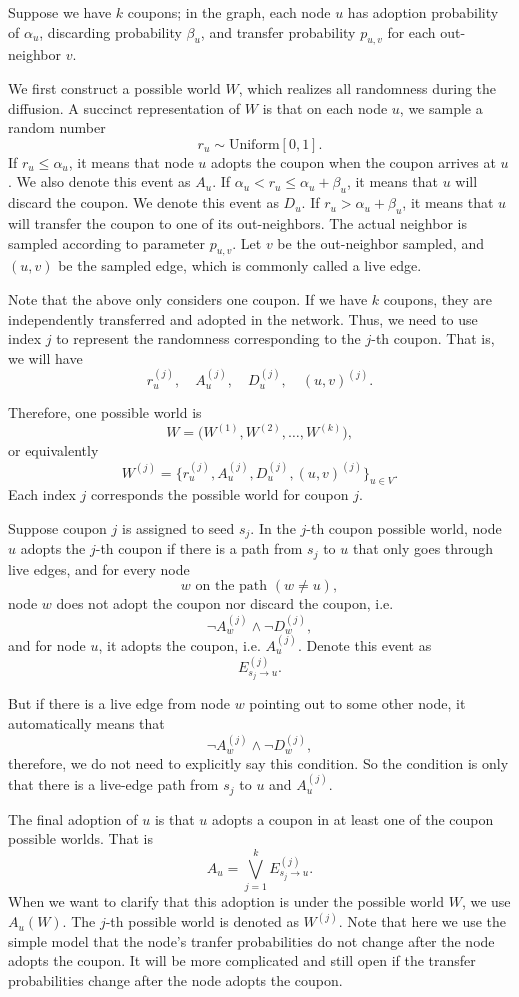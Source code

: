 \documentclass[11pt]{article}
\begin{document}
Suppose we have $k$ coupons; in the graph, each node $u$ has adoption probability of $\alpha_u$, discarding probability $\beta_u$, and transfer probability $p_{u,v}$ for each out-neighbor $v$.

We first construct a possible world $W$, which realizes all randomness during the diffusion. A succinct representation of $W$ is that on each node $u$, we sample a random number
\[
r_u \sim \mathrm{Uniform}[0,1].
\]
If $r_u \le \alpha_u$, it means that node $u$ adopts the coupon when the coupon arrives at $u$. We also denote this event as $A_u$.  
If $\alpha_u < r_u \le \alpha_u + \beta_u$, it means that $u$ will discard the coupon. We denote this event as $D_u$.  
If $r_u > \alpha_u + \beta_u$, it means that $u$ will transfer the coupon to one of its out-neighbors. The actual neighbor is sampled according to parameter $p_{u,v}$. Let $v$ be the out-neighbor sampled, and $(u,v)$ be the sampled edge, which is commonly called a live edge.

Note that the above only considers one coupon. If we have $k$ coupons, they are independently transferred and adopted in the network. Thus, we need to use index $j$ to represent the randomness corresponding to the $j$-th coupon. That is, we will have
\[
r_u^{(j)}, \quad A_u^{(j)}, \quad D_u^{(j)}, \quad (u,v)^{(j)}.
\]

Therefore, one possible world is
\[
W = \bigl(W^{(1)}, W^{(2)}, \dots, W^{(k)}\bigr),
\]
or equivalently
\[
W^{(j)} = \{ r_u^{(j)}, A_u^{(j)}, D_u^{(j)}, (u,v)^{(j)} \}_{u \in V}.
\]
Each index $j$ corresponds the possible world for coupon $j$.

Suppose coupon $j$ is assigned to seed $s_j$. In the $j$-th coupon possible world, node $u$ adopts the $j$-th coupon if there is a path from $s_j$ to $u$ that only goes through live edges, and for every node
\[
w \text{ on the path } (w \neq u),
\]
node $w$ does not adopt the coupon nor discard the coupon, i.e.
\[
\neg A_w^{(j)} \wedge \neg D_w^{(j)},
\]
and for node $u$, it adopts the coupon, i.e. $A_u^{(j)}$. Denote this event as
\[
E_{s_j \rightarrow u}^{(j)}.
\]

But if there is a live edge from node $w$ pointing out to some other node, it automatically means that
\[
\neg A_w^{(j)} \wedge \neg D_w^{(j)},
\]
therefore, we do not need to explicitly say this condition. So the condition is only that there is a live-edge path from $s_j$ to $u$ and $A_u^{(j)}$.

The final adoption of $u$ is that $u$ adopts a coupon in at least one of the coupon possible worlds. That is
\[
A_u = \bigvee_{j=1}^k E_{s_j \rightarrow u}^{(j)}.
\]
When we want to clarify that this adoption is under the possible world $W$, we use $A_u(W)$. The $j$-th possible world is denoted as $W^{(j)}$. Note that here we use the simple model that the node's tranfer probabilities do not change after the node adopts the coupon. It will be more complicated and still open if the transfer probabilities change after the node adopts the coupon.
\end{document}
